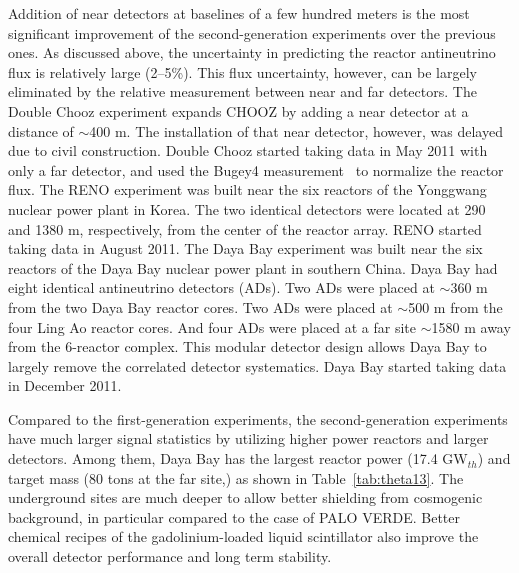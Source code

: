 \documentclass[aps,twocolumn,preprintnumbers,amsmath,superscriptaddress,amssymb,floats,nofootinbib]{revtex4-1}
\begin{document}
Addition of near detectors at baselines of a few hundred meters is the most significant improvement of the second-generation experiments over the previous ones.
As discussed above, the uncertainty in predicting the reactor antineutrino flux is relatively large (2--5\%). 
This flux uncertainty, however, can be largely eliminated by the relative measurement between near and far detectors. 
The Double Chooz experiment expands CHOOZ by adding a near detector at a distance of $\sim$400 m. 
The installation of that near detector, however, was delayed due to civil construction. 
Double Chooz started taking data in May 2011 with only a far detector, and used the Bugey4 measurement~\cite{Bugey4} to normalize the reactor flux. 
The RENO experiment was built near the six reactors of the Yonggwang nuclear power plant in Korea. 
The two identical detectors were located at 290 and 1380 m, respectively, from the center of the reactor array. 
RENO started taking data in August 2011. 
The Daya Bay experiment was built near the six reactors of the Daya Bay nuclear power plant in southern China. 
Daya Bay had eight identical antineutrino detectors (ADs). 
Two ADs were placed at $\sim$360 m from the two  Daya Bay reactor cores. 
Two ADs were placed at $\sim$500 m from the four Ling Ao reactor cores. 
And four ADs were placed at a far site $\sim$1580 m away from the 6-reactor complex. 
This modular detector design allows Daya Bay to largely remove the correlated detector systematics. 
Daya Bay started taking data in December 2011.

Compared to the first-generation experiments, the second-generation experiments have much larger signal statistics by utilizing higher power reactors and larger detectors. Among them, Daya Bay has the largest reactor power (17.4 GW$_{th}$) and target mass (80 tons at the far site,) as shown in Table~\ref{tab:theta13}. 
The underground sites are much deeper to allow better shielding from cosmogenic background, in particular compared to the case of PALO VERDE. 
Better chemical recipes of the gadolinium-loaded liquid scintillator also improve the overall detector performance and long term stability.
\end{document}
